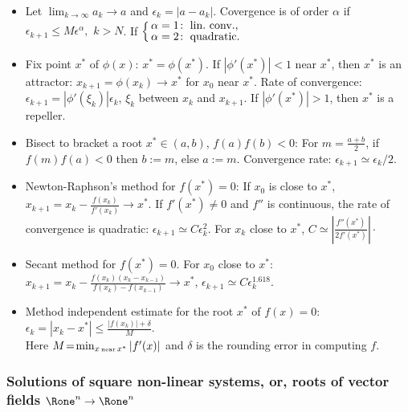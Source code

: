 \documentclass[a4paper]{article}
\begin{document}
\begin{itemize}
  \item Let $\lim_{k\to\infty}a_k\to a$
    and $\epsilon_k=|a-a_k|$.
    Covergence is of order $\alpha$ if
    $
    \epsilon_{k+1}\le M\epsilon^\alpha,
    $
    $k>N$.
    If
    $
    \Bigl\{\mkern-6mu
    \begin{array}{l}
      \alpha=1\!:~\text{lin.~conv.}, \\[-2pt]
      \alpha=2\!:~\text{quadratic}. \\
    \end{array}
    \Bigr.
    $

  \item Fix point $x^*$ of $\phi(x)$:
    $x^*=\phi(x^*)$.
    If $|\phi'(x^*)|<1$ near $x^*$, then
    $x^*$ is an attractor:
    $x_{k+1}=\phi(x_k)\to x^*$
    for $x_0$ near $x^*$.
    Rate of convergence: $\epsilon_{k+1}=|\phi'(\xi_k)|\epsilon_k$,
    $\xi_k$ between $x_k$ and $x_{k+1}$.
    If $|\phi'(x^*)|>1$, then $x^*$ is a repeller.

  \item Bisect to bracket a root $x^*\in(a,b)$, $f(a)f(b)<0$:
     For $m=\frac{a+b}{2}$, if $f(m)f(a)<0$ then $b:=m$, else $a:=m$.
     Convergence rate: $\epsilon_{k+1}\simeq \epsilon_k/2$.


  \item Newton-Raphson's method for $f(x^*)=0$: If $x_0$ is close to $x^*$,
    $x_{k+1}=x_k - \frac{f(x_k)}{f'(x_k)}\to x^*$.
    If $f'(x^*)\neq0$ and $f''$ is continuous, the rate of convergence is quadratic:
     $\epsilon_{k+1}\simeq C\epsilon_k^2$. For $x_k$ close to $x^*$,
     $C\simeq |\frac{f''(x^*)}{2f'(x^*)}|\cdot$

  \item Secant method for $f(x^*)=0$. For $x_0$ close to $x^*$:
    $x_{k+1}=x_k - \frac{f(x_k)(x_k-x_{k-1})}{f(x_k)-f(x_{k-1})}\to x^*$,
     $\epsilon_{k+1}\simeq C\epsilon_k^{1.618}.$

  \item Method independent estimate for the root $x^*$ of $f(x)=0$:
    $\epsilon_k=|x_k-x^*|\le \frac{|f(x_k)|+\delta}{M}$. \\
    Here
    $M\!=\!\min_{x\,\mbox{\tiny near}\,x^*}|f'(x)|$ and $\delta$
    is the rounding error in computing $f$.

\end{itemize}

\subsubsection*{Solutions of square non-linear systems, or, roots of vector fields $\Rone^n\to\Rone^n$}%
\end{document}
